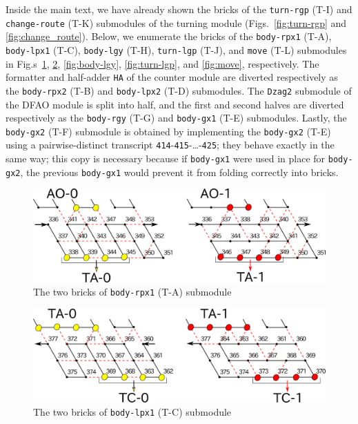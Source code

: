 \documentclass[runningheads]{llncs}
\begin{document}
Inside the main text, we have already shown the bricks of the \texttt{turn-rgp} (T-I) and \texttt{change-route} (T-K) submodules of the turning module (Figs.~\ref{fig:turn-rgp} and \ref{fig:change_route}). 
Below, we enumerate the bricks of the \texttt{body-rpx1} (T-A), \texttt{body-lpx1} (T-C), \texttt{body-lgy} (T-H), \texttt{turn-lgp} (T-J), and \texttt{move} (T-L) submodules in Fig.s~\ref{fig:body-rpx1}, \ref{fig:body-lpx1}, \ref{fig:body-lgy}, \ref{fig:turn-lgp}, and \ref{fig:move}, respectively. 
The formatter  and half-adder \texttt{HA} of the counter module are diverted respectively as the \texttt{body-rpx2} (T-B) and \texttt{body-lpx2} (T-D) submodules. 
The \texttt{Dzag2} submodule of the DFAO module is split into half, and the first and second halves are diverted respectively as the \texttt{body-rgy} (T-G) and \texttt{body-gx1} (T-E) submodules. 
Lastly, the \texttt{body-gx2} (T-F) submodule is obtained by implementing the \texttt{body-gx2} (T-E) using a pairwise-distinct transcript \texttt{414}-\texttt{415}-\dots-\texttt{425}; they behave exactly in the same way; this copy is necessary because if \texttt{body-gx1} were used in place for \texttt{body-gx2}, the previous \texttt{body-gx1} would prevent it from folding correctly into bricks. 

\begin{figure}[h]
\centering
\includegraphics[width=\linewidth]{Figs/body-rpx1.png}
\caption{The two bricks of \texttt{body-rpx1} (T-A) submodule}
\label{fig:body-rpx1}
\end{figure}

\begin{figure}[h]
\centering
\includegraphics[width=\linewidth]{Figs/body-lpx1.png}
\caption{The two bricks of \texttt{body-lpx1} (T-C) submodule}
\label{fig:body-lpx1}
\end{figure}
\end{document}
